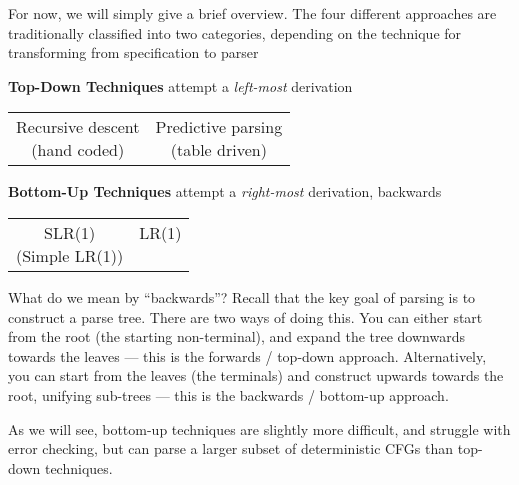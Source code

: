 For now, we will simply give a brief overview. The four different approaches are traditionally classified into two categories, depending on the technique for transforming from specification to parser

\textbf{Top-Down Techniques} attempt a \textit{left-most} derivation
\begin{center}
\begin{tabular}{cc}
\parbox{0.2\textwidth}{\centering
  {Recursive descent}\\
 (hand coded)
} &
\parbox{0.2\textwidth}{\centering
  {Predictive parsing} \\
    (table driven)
}
\end{tabular}
\end{center}

\textbf{Bottom-Up Techniques} attempt a \textit{right-most} derivation, backwards
\begin{center}
\begin{tabular}{cc}
\parbox{0.2\textwidth}{\centering
  {SLR(1)}\\
  (Simple LR(1))
} &
\parbox{0.2\textwidth}{\centering
  {LR(1)} \\~
}
\end{tabular}
\end{center}

What do we mean by ``backwards''? Recall that the key goal of parsing is to construct a parse tree. There are two ways of doing this. You can either start from the root (the starting non-terminal), and expand the tree downwards towards the leaves --- this is the forwards / top-down approach. Alternatively, you can start from the leaves (the terminals) and construct upwards towards the root, unifying sub-trees --- this is the backwards / bottom-up approach.

As we will see, bottom-up techniques are slightly more difficult, and struggle with error checking, but can parse a larger subset of deterministic CFGs than top-down techniques.
